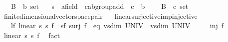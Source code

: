 \begin{isabellebody}
\ \ \ B{}\ {\isacharcolon}{\kern0pt}{\isacharcolon}{\kern0pt}\ {\isachardoublequoteopen}{\isacharprime}{\kern0pt}b\ set{\isachardoublequoteclose}\isanewline
\ \ \ s{}\ {\isacharcolon}{\kern0pt}{\isacharcolon}{\kern0pt}\ {\isachardoublequoteopen}{\isacharprime}{\kern0pt}a{\isacharcolon}{\kern0pt}{\isacharcolon}{\kern0pt}field\ {\isasymRightarrow}\ {\isacharprime}{\kern0pt}c{\isacharcolon}{\kern0pt}{\isacharcolon}{\kern0pt}ab{\isacharunderscore}{\kern0pt}group{\isacharunderscore}{\kern0pt}add\ {\isasymRightarrow}\ {\isacharprime}{\kern0pt}c{\isachardoublequoteclose}\ {\isacharparenleft}{\kern0pt}\ {\isachardoublequoteopen}{\isacharasterisk}{\kern0pt}b{\isachardoublequoteclose}\ {}{}{\isacharparenright}{\kern0pt}\isanewline
\ \ \ B{}\ {\isacharcolon}{\kern0pt}{\isacharcolon}{\kern0pt}\ {\isachardoublequoteopen}{\isacharprime}{\kern0pt}c\ set{\isachardoublequoteclose}\isanewline
{}\isanewline
\isanewline
{}\isamarkupfalse%
\ finite{\isacharunderscore}{\kern0pt}dimensional{\isacharunderscore}{\kern0pt}vector{\isacharunderscore}{\kern0pt}space{\isacharunderscore}{\kern0pt}pair{\isacharunderscore}{\kern0pt}{}%
\isadelimproof
\ %
\endisadelimproof
%
\isatagproof
\isacommand{{\isachardot}{\kern0pt}{\isachardot}{\kern0pt}}\isamarkupfalse%
%
\endisatagproof
{\isafoldproof}%
%
\isadelimproof
%
\endisadelimproof
\isanewline
\isanewline
{}\isamarkupfalse%
\ linear{\isacharunderscore}{\kern0pt}surjective{\isacharunderscore}{\kern0pt}imp{\isacharunderscore}{\kern0pt}injective{\isacharcolon}{\kern0pt}\isanewline
\ \ \ lf{\isacharcolon}{\kern0pt}\ {\isachardoublequoteopen}linear\ s{}\ s{}\ f{\isachardoublequoteclose}\ \ sf{\isacharcolon}{\kern0pt}\ {\isachardoublequoteopen}surj\ f{\isachardoublequoteclose}\ \ eq{\isacharcolon}{\kern0pt}\ {\isachardoublequoteopen}vs{}{\isachardot}{\kern0pt}dim\ UNIV\ {\isacharequal}{\kern0pt}\ vs{}{\isachardot}{\kern0pt}dim\ UNIV{\isachardoublequoteclose}\isanewline
\ \ \ \ \ {\isachardoublequoteopen}inj\ f{\isachardoublequoteclose}\isanewline
%
\isadelimproof
%
\endisadelimproof
%
\isatagproof
{}\isamarkupfalse%
\ {\isacharminus}{\kern0pt}\isanewline
\ \ \isamarkupfalse%
\ linear\ s{}\ s{}\ f\ \isamarkupfalse%
\ fact\isanewline
\ \ \isamarkupfalse%

\end{isabellebody}
